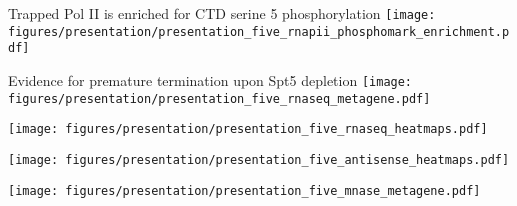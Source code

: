 \documentclass[aspectratio=169, 12pt]{beamer}
\begin{document}
\begin{frame}{Trapped Pol II is enriched for CTD serine 5 phosphorylation}
    \texttt{[image: figures/presentation/presentation\_five\_rnapii\_phosphomark\_enrichment.pdf]}
\end{frame}

\begin{frame}{Evidence for premature termination upon Spt5 depletion}
    \centering
    \texttt{[image: figures/presentation/presentation\_five\_rnaseq\_metagene.pdf]}
\end{frame}

\begin{frame}[t]
    \centering
    \texttt{[image: figures/presentation/presentation\_five\_rnaseq\_heatmaps.pdf]}
\end{frame}

\begin{frame}[t]
    \texttt{[image: figures/presentation/presentation\_five\_antisense\_heatmaps.pdf]}
\end{frame}

\begin{frame}[t]
    \texttt{[image: figures/presentation/presentation\_five\_mnase\_metagene.pdf]}
\end{frame}
\end{document}
